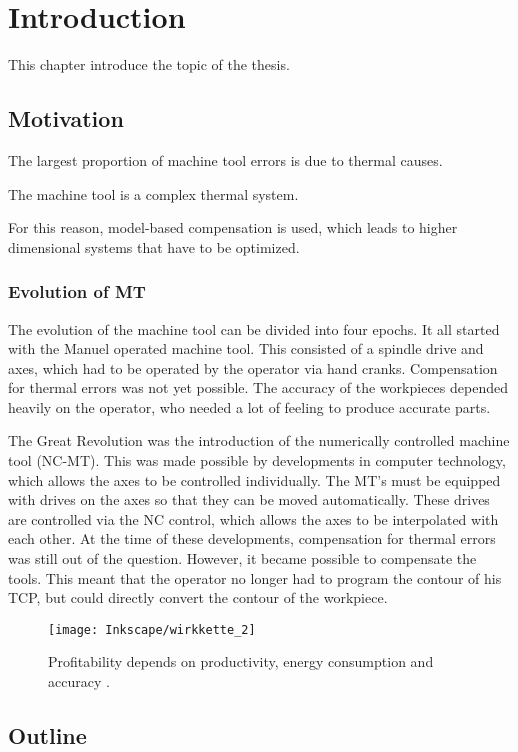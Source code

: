 \setcounter{chapter}{0}

\chapter{Introduction}
\label{sec:introduction}

This chapter introduce the topic of the thesis.

\section{Motivation}
\label{sec:motivation}

The largest proportion of machine tool errors is due to thermal causes.

The machine tool is a complex thermal system.

For this reason, model-based compensation is used, which leads to higher dimensional systems that have to be optimized.

\subsection{Evolution of MT}
\label{sec:evolution}

The evolution of the machine tool can be divided into four epochs. It all started with the Manuel operated machine tool. This consisted of a spindle drive and axes, which had to be operated by the operator via hand cranks. Compensation for thermal errors was not yet possible. The accuracy of the workpieces depended heavily on the operator, who needed a lot of feeling to produce accurate parts. 

The Great Revolution was the introduction of the numerically controlled machine tool (NC-MT). This was made possible by developments in computer technology, which allows the axes to be controlled individually. The MT's must be equipped with drives on the axes so that they can be moved automatically. These drives are controlled via the NC control, which allows the axes to be interpolated with each other. At the time of these developments, compensation for thermal errors was still out of the question. However, it became possible to compensate the tools. This meant that the operator no longer had to program the contour of his TCP, but could directly convert the contour of the workpiece. 


\begin{figure}[!htb]
    \centering
    \texttt{[image: Inkscape/wirkkette\_2]} %
    \caption[Economic and technical relationships]{Profitability depends on productivity, energy consumption and accuracy \cite{Weber2015}.}
    \label{fig:prf_accuracy}
\end{figure}
 



\section{Outline} %
\label{sec:outline}

